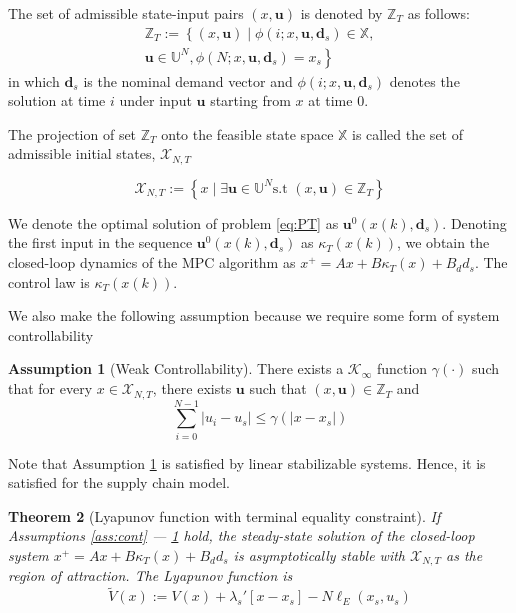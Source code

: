 \documentclass[10pt]{article}
\newcommand{\bu}{\mathbf{u}}
\newcommand{\bd}{\mathbf{d}}
\newcommand{\norm}[1]{\vert #1 \vert}
\newcommand{\set}[1]{\left\lbrace #1 \right\rbrace}
\newtheorem{theorem}{Theorem}
\theoremstyle{definition}
\newtheorem{assumption}[theorem]{Assumption}
\begin{document}
The set of admissible state-input pairs $(x,\bu)$ is denoted by
$\mathbb{Z}_T$ as follows:
\begin{multline*}\mathbb{Z}_T := \left \lbrace(x,\bu) \mid \phi(i;x,\bu,\bd_s) \in
  \mathbb{X} \right . ,\\ \left . \bu \in \mathbb{U}^N, \phi(N;x,\bu,\bd_s) = x_s\right\rbrace
\end{multline*}
in which $\bd_s$ is the nominal demand vector and
$\phi(i;x,\bu,\bd_s)$ denotes the solution at time $i$ under input
$\bu$ starting from $x$ at time $0$. 

The projection of set $\mathbb{Z}_T$ onto the feasible state space
$\mathbb{X}$ is called the set of admissible initial states,
$\mathcal{X}_{N,T}$

\[\mathcal{X}_{N,T} := \set{x \mid \exists \bu \in \mathbb{U}^N
  \text{s.t~} (x,\bu) \in \mathbb{Z}_T} \]

We denote the optimal solution of problem \eqref{eq:PT} as
$\bu^0(x(k),\bd_s)$. Denoting the first input in the sequence
$\bu^0(x(k),\bd_s)$ as $\kappa_T(x(k))$, we obtain the closed-loop
dynamics of the MPC algorithm as $x^+ = Ax+B\kappa_T(x)+B_dd_s$.  The
control law is $\kappa_T(x(k))$.

We also make the following assumption because we require some form of
system controllability
\begin{assumption}[Weak Controllability]
\label{ass:weak_controllability}
There exists a $\mathcal{K}_\infty$ function $\gamma(\cdot)$ such that
for every $x \in \mathcal{X}_{N,T}$, there exists $\bu$ such that
$(x,\bu) \in \mathbb{Z}_T$ and 
\begin{equation}
\label{eq:weak_controllability}
\sum_{i=0}^{N-1} \norm{u_i-u_s} \leq \gamma(\norm{x-x_s})
\end{equation}
\end{assumption}

Note that Assumption \ref{ass:weak_controllability} is satisfied by
linear stabilizable systems. Hence, it is satisfied for the supply
chain model.

\begin{theorem}[Lyapunov function with terminal equality constraint]
\label{thm:EqualityConstraint}
If Assumptions \ref{ass:cont} --- \ref{ass:weak_controllability}
hold, the steady-state solution of the closed-loop system $x^+ =
Ax+B\kappa_T(x)+B_dd_s$ is asymptotically stable with
$\mathcal{X}_{N,T}$ as the region of attraction. The Lyapunov function
is
\[ \tilde{V}(x) := V(x) +\lambda_s'[x-x_s]-N\ell_E(x_s,u_s) \]
\end{theorem}
 
\end{document}
